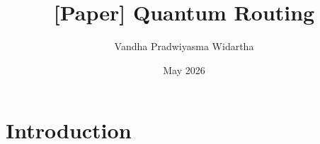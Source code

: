 \documentclass{article}
\title{[Paper] Quantum Routing}
\author{Vandha Pradwiyasma Widartha}
\date{May 2026}
\begin{document}
\maketitle

\section{Introduction}
\end{document}
